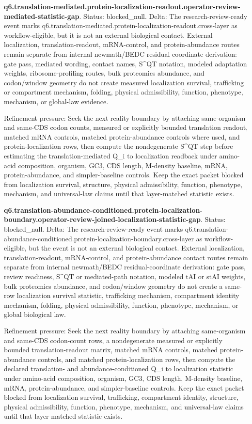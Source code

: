 \textbf{q6.translation-mediated.protein-localization-readout.operator-review-mediated-statistic-gap}. Status: blocked\_null. Delta: The research-review-ready event marks q6.translation-mediated.protein-localization-readout.cross-layer as workflow-eligible, but it is not an external biological contact. External localization, translation-readout, mRNA-control, and protein-abundance routes remain separate from internal newmath/BEDC residual-coordinate derivation: gate pass, mediated wording, contact names, S\textasciicircum{}QT notation, modeled adaptation weights, ribosome-profiling routes, bulk proteomics abundance, and codon/window geometry do not create measured localization survival, trafficking or compartment mechanism, folding, physical admissibility, function, phenotype, mechanism, or global-law evidence.

Refinement pressure: Seek the next reality boundary by attaching same-organism and same-CDS codon counts, measured or explicitly bounded translation readout, matched mRNA controls, matched protein-abundance controls where used, and protein-localization rows, then compute the nondegenerate S\textasciicircum{}QT step before estimating the translation-mediated Q\_i to localization readback under amino-acid composition, organism, GC3, CDS length, M-density baseline, mRNA, protein-abundance, and simpler-baseline controls. Keep the exact packet blocked from localization survival, structure, physical admissibility, function, phenotype, mechanism, and universal-law claims until that layer-matched statistic exists.

\textbf{q6.translation-abundance-conditioned.protein-localization-boundary.operator-review-joined-localization-statistic-gap}. Status: blocked\_null. Delta: The research-review-ready event marks q6.translation-abundance-conditioned.protein-localization-boundary.cross-layer as workflow-eligible, but the event is not an external biological contact. External localization, translation-readout, mRNA-control, and protein-abundance contact routes remain separate from internal newmath/BEDC residual-coordinate derivation: gate pass, review readiness, S\textasciicircum{}QT or mediated-path notation, modeled tAI or stAI weights, bulk proteomics abundance, and codon/window geometry do not create a same-row localization survival statistic, trafficking mechanism, compartment identity mechanism, folding, physical admissibility, function, phenotype, mechanism, or global biological law.

Refinement pressure: Seek the next reality boundary by attaching same-organism and same-CDS codon-count rows, a nondegenerate measured or explicitly bounded translation-readout matrix, matched mRNA controls, matched protein-abundance controls, and matched protein-localization rows, then compute the declared translation- and abundance-conditioned Q\_i to localization statistic under amino-acid composition, organism, GC3, CDS length, M-density baseline, mRNA, protein-abundance, and simpler-baseline controls. Keep the exact packet blocked from localization survival, trafficking, compartment identity, structure, physical admissibility, function, phenotype, mechanism, and universal-law claims until that layer-matched statistic exists.

